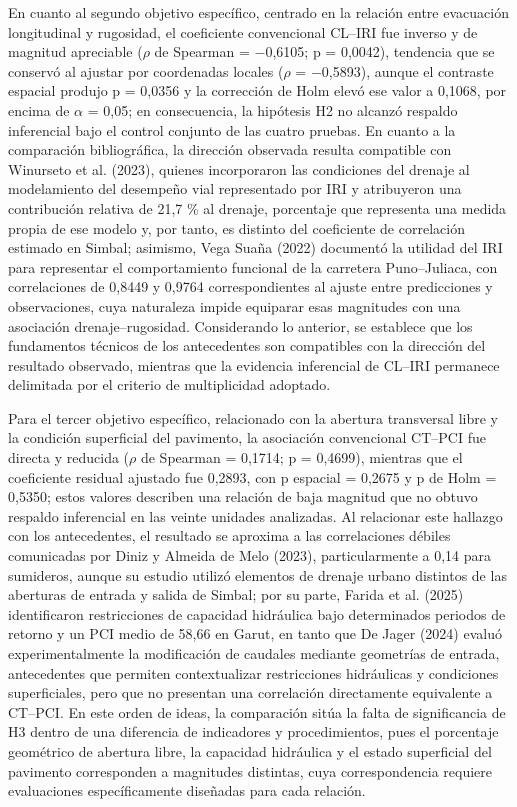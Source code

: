 En cuanto al segundo objetivo específico, centrado en la relación entre evacuación longitudinal y rugosidad, el coeficiente convencional CL--IRI fue inverso y de magnitud apreciable ($\rho$ de Spearman = $-$0,6105; p = 0,0042), tendencia que se conservó al ajustar por coordenadas locales ($\rho$ = $-$0,5893), aunque el contraste espacial produjo p = 0,0356 y la corrección de Holm elevó ese valor a 0,1068, por encima de $\alpha$ = 0,05; en consecuencia, la hipótesis H2 no alcanzó respaldo inferencial bajo el control conjunto de las cuatro pruebas. En cuanto a la comparación bibliográfica, la dirección observada resulta compatible con Winurseto et al. (2023), quienes incorporaron las condiciones del drenaje al modelamiento del desempeño vial representado por IRI y atribuyeron una contribución relativa de 21,7 \% al drenaje, porcentaje que representa una medida propia de ese modelo y, por tanto, es distinto del coeficiente de correlación estimado en Simbal; asimismo, Vega Suaña (2022) documentó la utilidad del IRI para representar el comportamiento funcional de la carretera Puno--Juliaca, con correlaciones de 0,8449 y 0,9764 correspondientes al ajuste entre predicciones y observaciones, cuya naturaleza impide equiparar esas magnitudes con una asociación drenaje--rugosidad. Considerando lo anterior, se establece que los fundamentos técnicos de los antecedentes son compatibles con la dirección del resultado observado, mientras que la evidencia inferencial de CL--IRI permanece delimitada por el criterio de multiplicidad adoptado.

Para el tercer objetivo específico, relacionado con la abertura transversal libre y la condición superficial del pavimento, la asociación convencional CT--PCI fue directa y reducida ($\rho$ de Spearman = 0,1714; p = 0,4699), mientras que el coeficiente residual ajustado fue 0,2893, con p espacial = 0,2675 y p de Holm = 0,5350; estos valores describen una relación de baja magnitud que no obtuvo respaldo inferencial en las veinte unidades analizadas. Al relacionar este hallazgo con los antecedentes, el resultado se aproxima a las correlaciones débiles comunicadas por Diniz y Almeida de Melo (2023), particularmente a 0,14 para sumideros, aunque su estudio utilizó elementos de drenaje urbano distintos de las aberturas de entrada y salida de Simbal; por su parte, Farida et al. (2025) identificaron restricciones de capacidad hidráulica bajo determinados periodos de retorno y un PCI medio de 58,66 en Garut, en tanto que De Jager (2024) evaluó experimentalmente la modificación de caudales mediante geometrías de entrada, antecedentes que permiten contextualizar restricciones hidráulicas y condiciones superficiales, pero que no presentan una correlación directamente equivalente a CT--PCI. En este orden de ideas, la comparación sitúa la falta de significancia de H3 dentro de una diferencia de indicadores y procedimientos, pues el porcentaje geométrico de abertura libre, la capacidad hidráulica y el estado superficial del pavimento corresponden a magnitudes distintas, cuya correspondencia requiere evaluaciones específicamente diseñadas para cada relación.


